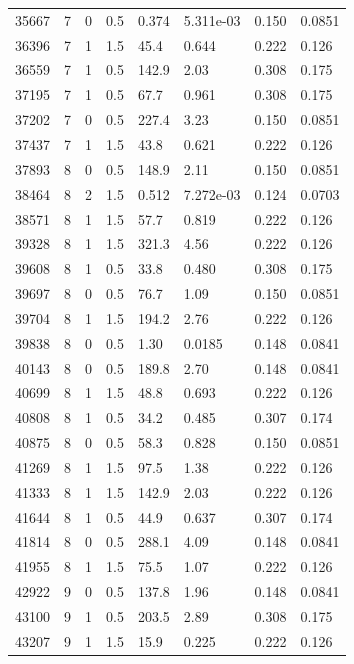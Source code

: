 \documentclass[preview]{standalone}
\begin{document}
{{{\begin{tabular}{L{1.2cm}C{1.2cm} C{0.3cm}C{0.5cm} C{1.4cm}C{1.4cm} C{1.4cm}C{1.4cm}}
  35667  &     7  & 0     & 0.5 &  0.374  & 5.311e-03  & 0.150 &  0.0851   \\ 
  36396  &     7  & 1     & 1.5 &  45.4  & 0.644  & 0.222 &  0.126   \\ 
  36559  &     7  & 1     & 0.5 &  142.9  & 2.03  & 0.308 &  0.175   \\ 
  37195  &     7  & 1     & 0.5 &  67.7  & 0.961  & 0.308 &  0.175   \\ 
  37202  &     7  & 0     & 0.5 &  227.4  & 3.23  & 0.150 &  0.0851   \\ 
  37437  &     7  & 1     & 1.5 &  43.8  & 0.621  & 0.222 &  0.126   \\ 
  37893  &     8  & 0     & 0.5 &  148.9  & 2.11  & 0.150 &  0.0851   \\ 
  38464  &     8  & 2     & 1.5 &  0.512  & 7.272e-03  & 0.124 &  0.0703   \\ 
  38571  &     8  & 1     & 1.5 &  57.7  & 0.819  & 0.222 &  0.126   \\ 
  39328  &     8  & 1     & 1.5 &  321.3  & 4.56  & 0.222 &  0.126   \\ 
  39608  &     8  & 1     & 0.5 &  33.8  & 0.480  & 0.308 &  0.175   \\ 
  39697  &     8  & 0     & 0.5 &  76.7  & 1.09  & 0.150 &  0.0851   \\ 
  39704  &     8  & 1     & 1.5 &  194.2  & 2.76  & 0.222 &  0.126   \\ 
  39838  &     8  & 0     & 0.5 &  1.30  & 0.0185  & 0.148 &  0.0841   \\ 
  40143  &     8  & 0     & 0.5 &  189.8  & 2.70  & 0.148 &  0.0841   \\ 
  40699  &     8  & 1     & 1.5 &  48.8  & 0.693  & 0.222 &  0.126   \\ 
  40808  &     8  & 1     & 0.5 &  34.2  & 0.485  & 0.307 &  0.174   \\ 
  40875  &     8  & 0     & 0.5 &  58.3  & 0.828  & 0.150 &  0.0851   \\ 
  41269  &     8  & 1     & 1.5 &  97.5  & 1.38  & 0.222 &  0.126   \\ 
  41333  &     8  & 1     & 1.5 &  142.9  & 2.03  & 0.222 &  0.126   \\ 
  41644  &     8  & 1     & 0.5 &  44.9  & 0.637  & 0.307 &  0.174   \\ 
  41814  &     8  & 0     & 0.5 &  288.1  & 4.09  & 0.148 &  0.0841   \\ 
  41955  &     8  & 1     & 1.5 &  75.5  & 1.07  & 0.222 &  0.126   \\ 
  42922  &     9  & 0     & 0.5 &  137.8  & 1.96  & 0.148 &  0.0841   \\ 
  43100  &     9  & 1     & 0.5 &  203.5  & 2.89  & 0.308 &  0.175   \\ 
  43207  &     9  & 1     & 1.5 &  15.9  & 0.225  & 0.222 &  0.126   \\ 
\hline 
\end{tabular} 

}}}
\end{document}
